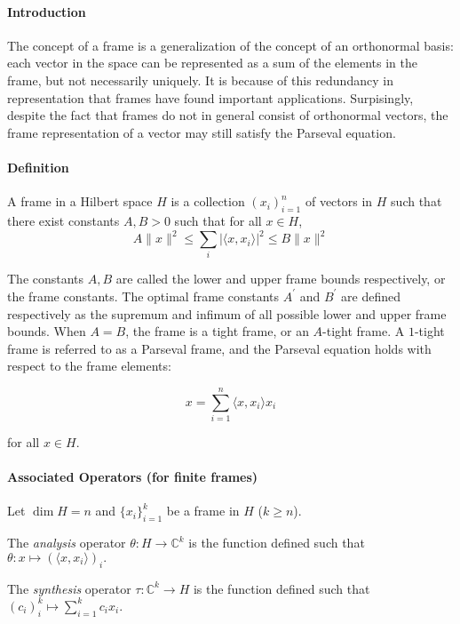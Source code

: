 \documentclass[12pt]{article}
\begin{document}
\paragraph{Introduction}

The concept of a frame is a generalization of the concept of an orthonormal basis: each vector in the space can be represented as a sum of the elements in the frame, but not necessarily uniquely. It is because of this redundancy in representation that frames have found important applications. Surpisingly, despite the fact that frames do not in general consist of orthonormal vectors, the frame representation of a vector may still satisfy the Parseval equation.

\paragraph{Definition}
A frame in a Hilbert space $H$ is a collection $(x_i)_{i=1}^n$ of vectors in $H$ such that there exist constants $A, B > 0$ such that for all $x \in H$,
$$A \|x\|^2 \leq \sum_i |\langle x, x_i\rangle|^2 \leq B\|x\|^2$$

The constants $A, B$ are called the lower and upper frame bounds respectively, or the frame constants. The optimal frame constants $A^\prime$ and $B^\prime$ are defined respectively as the supremum and infimum of all possible lower and upper frame bounds. When $A=B$, the frame is a tight frame, or an $A$-tight frame. A $1$-tight frame is referred to as a Parseval frame, and the Parseval equation holds with respect to the frame elements:

$$x = \sum_{i=1}^n \langle x, x_i \rangle x_i$$

for all $x \in H$.

\paragraph{Associated Operators (for finite frames)}Let $\dim H = n$ and $\{x_i\}_{i=1}^k$ be a frame in $H$ ($k \ge n$). 

The {\it analysis} operator $\theta: H \rightarrow {\mathbb C}^k$  is the function defined such that $\theta: x \mapsto (\langle x, x_i \rangle)_i.$

The {\it synthesis} operator $\tau: {\mathbb C}^k \rightarrow H$ is the function defined such that $(c_i)_i^k \mapsto \sum_{i=1}^k c_i x_i.$
\end{document}

